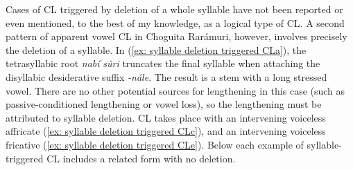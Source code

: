     \z
\z


Cases of CL triggered by deletion of a whole syllable have not been reported or even mentioned, to the best of my knowledge, as a logical type of CL. A second pattern of apparent vowel CL in Choguita Rarámuri, however, involves precisely the deletion of a syllable. In (\ref{ex: syllable deletion triggered CLa}), the tetrasyllabic root \textit{nabiˈsûri} truncates the final syllable when attaching the disyllabic desiderative suffix \textit{-nále}. The result is a stem with a long stressed vowel. There are no other potential sources for lengthening in this case (such as passive-conditioned lengthening or vowel loss), so the lengthening must be attributed to syllable deletion. CL takes place with an intervening voiceless affricate (\ref{ex: syllable deletion triggered CLc}), and an intervening voiceless fricative (\ref{ex: syllable deletion triggered CLe}). Below each example of syllable-triggered CL includes a related form with no deletion.

